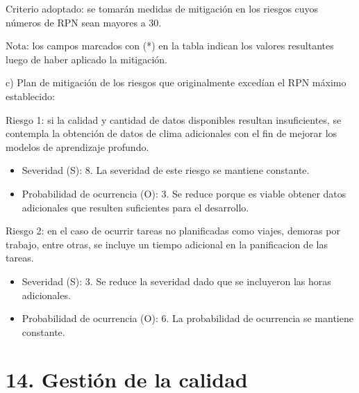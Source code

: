 \documentclass[
11pt, %
]{charter}
\begin{document}
Criterio adoptado: se tomarán medidas de mitigación en los riesgos cuyos números de RPN sean
mayores a 30.

Nota: los campos marcados con (*) en la tabla indican los valores resultantes luego de haber
aplicado la mitigación.


c) Plan de mitigación de los riesgos que originalmente excedían el RPN máximo establecido:

Riesgo 1: si la calidad y cantidad de datos disponibles resultan insuficientes, se contempla la obtención
de datos de clima adicionales con el fin de mejorar los modelos de aprendizaje profundo.

\begin{itemize} 
\item Severidad (S): 8.
La severidad de este riesgo se mantiene constante.
\item Probabilidad de ocurrencia (O): 3.
Se reduce porque es viable obtener datos adicionales que resulten suficientes para el desarrollo.
\end{itemize}

Riesgo 2: en el caso de ocurrir tareas no planificadas como viajes, demoras por trabajo, entre otras, 
se incluye un tiempo adicional en la panificacion de las tareas.

\begin{itemize} 
\item Severidad (S): 3.
Se reduce la severidad dado que se incluyeron las horas adicionales.
\item Probabilidad de ocurrencia (O): 6.
La probabilidad de ocurrencia se mantiene constante.
\end{itemize}

\section{14. Gestión de la calidad}
\label{sec:calidad}
\end{document}
